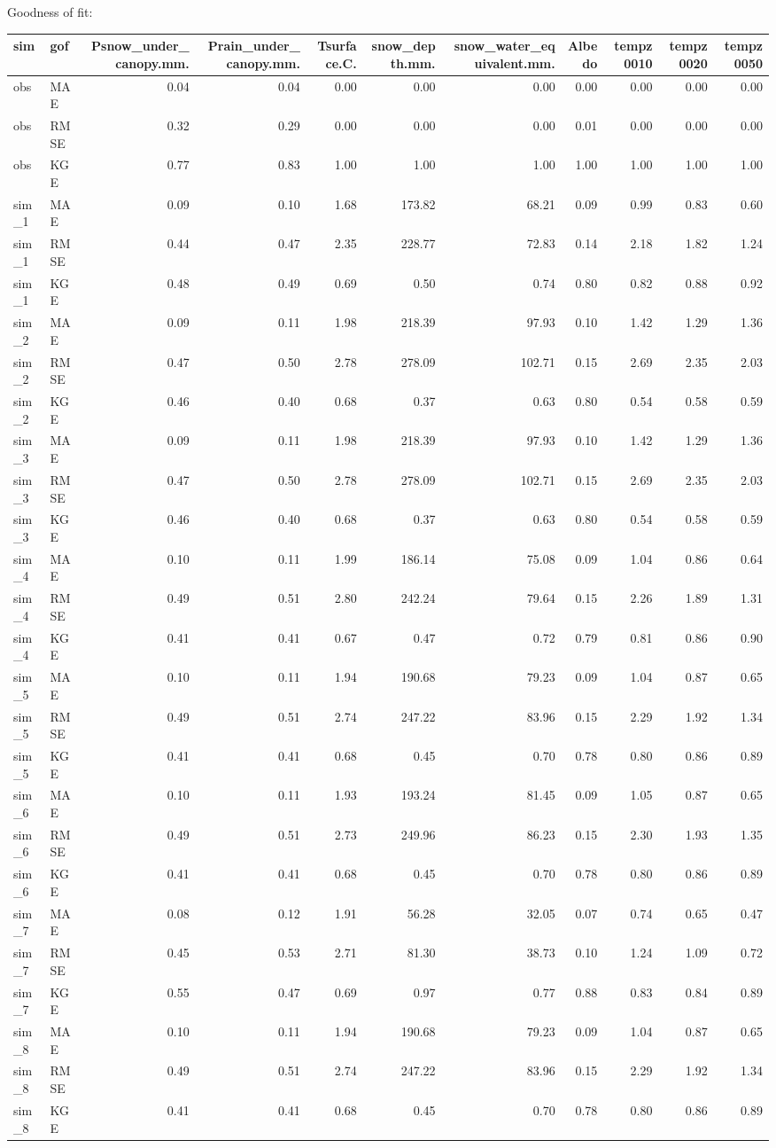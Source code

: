 \documentclass[
]{article}
\begin{document}
Goodness of fit:

\begin{longtable}[]{@{}llrrrrrrrrr@{}}
\toprule
sim & gof & Psnow\_under\_canopy.mm. & Prain\_under\_canopy.mm. &
Tsurface.C. & snow\_depth.mm. & snow\_water\_equivalent.mm. & Albedo &
tempz0010 & tempz0020 & tempz0050\tabularnewline
\midrule
\endhead
obs & MAE & 0.04 & 0.04 & 0.00 & 0.00 & 0.00 & 0.00 & 0.00 & 0.00 &
0.00\tabularnewline
obs & RMSE & 0.32 & 0.29 & 0.00 & 0.00 & 0.00 & 0.01 & 0.00 & 0.00 &
0.00\tabularnewline
obs & KGE & 0.77 & 0.83 & 1.00 & 1.00 & 1.00 & 1.00 & 1.00 & 1.00 &
1.00\tabularnewline
sim\_1 & MAE & 0.09 & 0.10 & 1.68 & 173.82 & 68.21 & 0.09 & 0.99 & 0.83
& 0.60\tabularnewline
sim\_1 & RMSE & 0.44 & 0.47 & 2.35 & 228.77 & 72.83 & 0.14 & 2.18 & 1.82
& 1.24\tabularnewline
sim\_1 & KGE & 0.48 & 0.49 & 0.69 & 0.50 & 0.74 & 0.80 & 0.82 & 0.88 &
0.92\tabularnewline
sim\_2 & MAE & 0.09 & 0.11 & 1.98 & 218.39 & 97.93 & 0.10 & 1.42 & 1.29
& 1.36\tabularnewline
sim\_2 & RMSE & 0.47 & 0.50 & 2.78 & 278.09 & 102.71 & 0.15 & 2.69 &
2.35 & 2.03\tabularnewline
sim\_2 & KGE & 0.46 & 0.40 & 0.68 & 0.37 & 0.63 & 0.80 & 0.54 & 0.58 &
0.59\tabularnewline
sim\_3 & MAE & 0.09 & 0.11 & 1.98 & 218.39 & 97.93 & 0.10 & 1.42 & 1.29
& 1.36\tabularnewline
sim\_3 & RMSE & 0.47 & 0.50 & 2.78 & 278.09 & 102.71 & 0.15 & 2.69 &
2.35 & 2.03\tabularnewline
sim\_3 & KGE & 0.46 & 0.40 & 0.68 & 0.37 & 0.63 & 0.80 & 0.54 & 0.58 &
0.59\tabularnewline
sim\_4 & MAE & 0.10 & 0.11 & 1.99 & 186.14 & 75.08 & 0.09 & 1.04 & 0.86
& 0.64\tabularnewline
sim\_4 & RMSE & 0.49 & 0.51 & 2.80 & 242.24 & 79.64 & 0.15 & 2.26 & 1.89
& 1.31\tabularnewline
sim\_4 & KGE & 0.41 & 0.41 & 0.67 & 0.47 & 0.72 & 0.79 & 0.81 & 0.86 &
0.90\tabularnewline
sim\_5 & MAE & 0.10 & 0.11 & 1.94 & 190.68 & 79.23 & 0.09 & 1.04 & 0.87
& 0.65\tabularnewline
sim\_5 & RMSE & 0.49 & 0.51 & 2.74 & 247.22 & 83.96 & 0.15 & 2.29 & 1.92
& 1.34\tabularnewline
sim\_5 & KGE & 0.41 & 0.41 & 0.68 & 0.45 & 0.70 & 0.78 & 0.80 & 0.86 &
0.89\tabularnewline
sim\_6 & MAE & 0.10 & 0.11 & 1.93 & 193.24 & 81.45 & 0.09 & 1.05 & 0.87
& 0.65\tabularnewline
sim\_6 & RMSE & 0.49 & 0.51 & 2.73 & 249.96 & 86.23 & 0.15 & 2.30 & 1.93
& 1.35\tabularnewline
sim\_6 & KGE & 0.41 & 0.41 & 0.68 & 0.45 & 0.70 & 0.78 & 0.80 & 0.86 &
0.89\tabularnewline
sim\_7 & MAE & 0.08 & 0.12 & 1.91 & 56.28 & 32.05 & 0.07 & 0.74 & 0.65 &
0.47\tabularnewline
sim\_7 & RMSE & 0.45 & 0.53 & 2.71 & 81.30 & 38.73 & 0.10 & 1.24 & 1.09
& 0.72\tabularnewline
sim\_7 & KGE & 0.55 & 0.47 & 0.69 & 0.97 & 0.77 & 0.88 & 0.83 & 0.84 &
0.89\tabularnewline
sim\_8 & MAE & 0.10 & 0.11 & 1.94 & 190.68 & 79.23 & 0.09 & 1.04 & 0.87
& 0.65\tabularnewline
sim\_8 & RMSE & 0.49 & 0.51 & 2.74 & 247.22 & 83.96 & 0.15 & 2.29 & 1.92
& 1.34\tabularnewline
sim\_8 & KGE & 0.41 & 0.41 & 0.68 & 0.45 & 0.70 & 0.78 & 0.80 & 0.86 &
0.89\tabularnewline
\bottomrule
\end{longtable}
\end{document}
